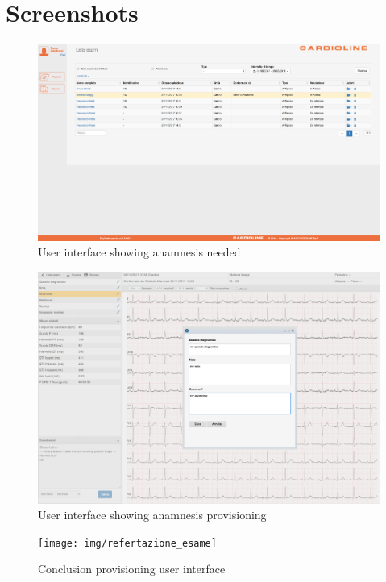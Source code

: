 \section{Screenshots}
\begin{figure}[h]
    \includegraphics[width=\textwidth]{img/todo_anamnesi}
    \caption{User interface showing anamnesis needed}
    \label{fig:todo_anamnesi}
\end{figure}

\begin{figure}[h]
    \includegraphics[width=\textwidth]{img/aggiunta_anamnesi}
    \caption{User interface showing anamnesis provisioning}
    \label{fig:aggiunta_anamnesi}
\end{figure}

\begin{figure}[h]
    \texttt{[image: img/refertazione\_esame]}
    \caption{Conclusion provisioning user interface}
    \label{fig:refertazione_esame}
\end{figure}



